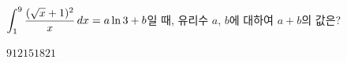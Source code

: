 $\displaystyle\int_{1}^{9}\dfrac{(\sqrt{x}+1)^2}{x}\mkern3mu dx=a\ln 3+b$일 때, 유리수 $a$, $b$에 대하여 $a+b$의 값은?
\begin{choices32}{$9$}{$12$}{$15$}{$18$}{$21$}\end{choices32}
